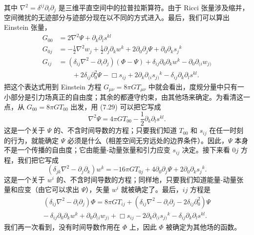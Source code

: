 其中 $\nabla^{2} = \delta^{ij}\partial_{i}\partial_{j}$ 是三维平直空间中的拉普拉斯算符。由于 Ricci 张量涉及缩并，空间微扰的无迹部分与迹部分现在以不同的方式进入。最后，我们可以算出 Einstein 张量，
\begin{align*}
G_{00} &= 2\nabla^{2}\Psi + \partial_{k}\partial_{l}s^{kl} \\
G_{0j} &= -\frac{1}{2}\nabla^{2}w_{j} + \frac{1}{2}\partial_{j}\partial_{k}w^{k} + 2\partial_{0}\partial_{j}\Psi + \partial_{0}\partial_{k}s_{j}{}^{k} \\
G_{ij} &= (\delta_{ij}\nabla^{2} - \partial_{i}\partial_{j})(\Phi - \Psi) + \delta_{ij}\partial_{0}\partial_{k}w^{k} - \partial_{0}\partial_{(i}w_{j)} \\
&\qquad + 2\delta_{ij}\partial_{0}^{2}\Psi - \Box s_{ij} + 2\partial_{k}\partial_{(i}s_{j)}{}^{k} - \delta_{ij}\partial_{k}\partial_{l}s^{kl}.
\tag{7.29}
\end{align*}
把这个表达式用到 Einstein 方程 $G_{\mu\nu} = 8\pi GT_{\mu\nu}$ 中就会看出，度规分量中只有一小部分是引力场真正的自由度；其余的都遵守约束，由其他场来确定。为看清这一点，从 $G_{00} = 8\pi GT_{00}$ 出发，用 (7.29) 可以把它写成
\begin{equation*}
\nabla^{2}\Psi = 4\pi GT_{00} - \frac{1}{2}\partial_{k}\partial_{l}s^{kl}.
\tag{7.30}
\end{equation*}
这是一个关于 $\Psi$ 的、不含时间导数的方程；只要我们知道 $T_{00}$ 和 $s_{ij}$ 在任一时刻的行为，就能确定 $\Psi$ 必须是什么（相差空间无穷远处的边界条件）。因此，$\Psi$ 本身不是一个传播的自由度；它由能量-动量张量和引力应变 $s_{ij}$ 决定。接下来看 $0j$ 方程，我们把它写成
\begin{equation*}
(\delta_{jk}\nabla^{2} - \partial_{j}\partial_{k})w^{k} = -16\pi GT_{0j} + 4\partial_{0}\partial_{j}\Psi + 2\partial_{0}\partial_{k}s_{j}{}^{k}.
\tag{7.31}
\end{equation*}
这是一个关于 $w^{i}$ 的、不含时间导数的方程；同样地，只要我们知道能量-动量张量和应变（由它可以求出 $\Psi$），矢量 $w^{i}$ 就被确定了。最后，$ij$ 方程是
\begin{align*}
(\delta_{ij}\nabla^{2} - \partial_{i}\partial_{j})\Phi = 8\pi GT_{ij} + (\delta_{ij}\nabla^{2} - \partial_{i}\partial_{j} - 2\delta_{ij}\partial_{0}^{2})\Psi \\
-\ \delta_{ij}\partial_{0}\partial_{k}w^{k} + \partial_{0}\partial_{(i}w_{j)} + \Box s_{ij} - 2\partial_{k}\partial_{(i}s_{j)}{}^{k} - \delta_{ij}\partial_{k}\partial_{l}s^{kl}.
\tag{7.32}
\end{align*}
我们再一次看到，没有时间导数作用在 $\Phi$ 上，因此 $\Phi$ 被确定为其他场的函数。

